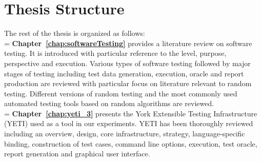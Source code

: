 %
\bigskip
\section{Thesis Structure}

The rest of the thesis is organized as follows:\\

\hangindent=\parindent
{}
\noindent
\textbf{Chapter~\ref{chap:softwareTesting}} provides a literature review on software testing. It is introduced with particular reference to the level, purpose, perspective and execution. Various types of software testing followed by major stages of testing including test data generation, execution, oracle and report production are reviewed with particular focus on literature relevant to random testing. Different versions of random testing and the most commonly used automated testing tools based on random algorithms are reviewed. \\


\hangindent=\parindent
{}
\noindent
\textbf{Chapter~\ref{chap:yeti_3}} presents the York Extensible Testing Infrastructure (YETI) used as a tool in our experiments. YETI has been thoroughly reviewed including an overview, design, core infrastructure, strategy, language-specific binding, construction of test cases, command line options, execution, test oracle, report generation and graphical user interface.\\

